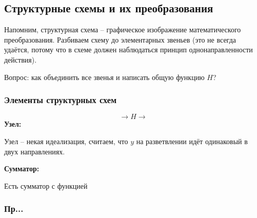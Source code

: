 \documentclass[main.tex]{subfiles}
\begin{document}
\subsection{Структурные схемы и их преобразования}

Напомним, структурная схема -- графическое изображение математического преобразования.
Разбиваем схему до элементарных звеньев (это не всегда удаётся, потому что в схеме должен наблюдаться принцип однонаправленности действия).

Вопрос: как объединить все звенья и написать общую функцию $ H $?

\subsubsection{Элементы структурных схем}

$$ \rightarrow \boxed{H} \rightarrow $$
\textbf{Узел:} %

Узел -- некая идеализация, считаем, что $ y $ на разветвлении идёт одинаковый в двух направлениях.

\textbf{Сумматор:} %

Есть сумматор с функцией

\subsubsection{Пр...} %


\subsubsection{}
\end{document}
